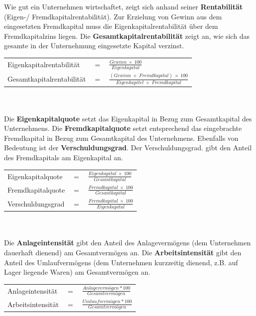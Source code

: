 Wie gut ein Unternehmen wirtschaftet, zeigt sich anhand seiner {\bf Rentabilität} (Eigen-/ Fremdkapitalrentabilität). Zur Erzielung von Gewinn aus dem eingesetzten Fremdkapital muss die Eigenkapitalrentabilität über dem Fremdkapitalzins liegen. Die {\bf Gesamtkapitalrentabilität} zeigt an, wie sich das gesamte in der Unternehmung eingesetzte Kapital verzinst.\\

\begin{tabular}{lll}
Eigenkapitalrentabilität & $=$ & $\frac{Gewinn\ \times\ 100}{Eigenkapital}$\\
Gesamtkapitalrentabilität & $=$ & $\frac{(Gewinn\ +\ Fremdkapital)\ \times\ 100}{Eigenkapitel\ +\ Fremdkapital}$	\\
\end{tabular}\\\\

Die {\bf Eigenkapitalquote} setzt das Eigenkapital in Bezug zum Gesamtkapital des Unternehmens. Die {\bf Fremdkapitalquote} setzt entsprechend das eingebrachte Fremdkapital in Bezug zum Gesamtkapital des Unternehmens. Ebenfalls von Bedeutung ist der {\bf Verschuldungsgrad}. Der Verschuldungsgrad. gibt den Anteil des Fremdkapitals am Eigenkapital an.\\

\begin{tabular}{lll}
	Eigenkapitalquote & $=$ & $\frac{Eigenkapital\ \times\ 100}{Gesamtkapital}$\\
	Fremdkapitalquote & $=$ & $\frac{Fremdkapital\ \times\ 100}{Gesantkapital}$\\
	Verschuldungsgrad & $=$ & $\frac{Fremdkapital\ \times\ 100}{Eigenkapital}$\\
\end{tabular}\\\\

Die {\bf Anlageintensität} gibt den Anteil des Anlagevermögens (dem Unternehmen dauerhaft dienend) am Gesamtvermögen an. Die {\bf Arbeitsintensität} gibt den Anteil des Umlaufvermögens (dem Unternehmen kurzzeitig dienend, z.B. auf Lager liegende Waren) am Gesamtvermögen an.\\

\begin{tabular}{lll}
Anlageintensität & $=$ & $\frac{Anlagevermögen * 100}{Gesamtvermögen}$\\ 
Arbeitsintensität & $=$ & $\frac{Umlaufvermögen * 100}{Gesamtvermögen}$\\
\end{tabular}\\\\

